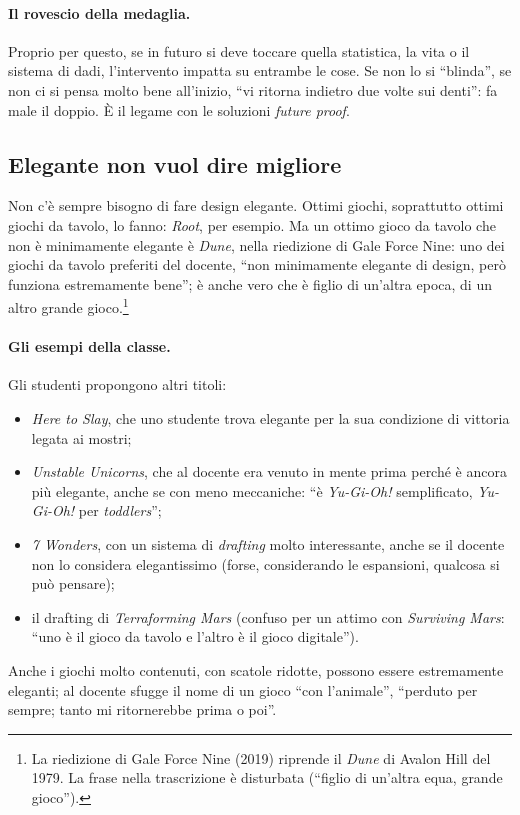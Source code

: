 \paragraph{Il rovescio della medaglia.} Proprio per questo, se in futuro si
deve toccare quella statistica, la vita o il sistema di dadi, l'intervento
impatta su entrambe le cose. Se non lo si ``blinda'', se non ci si pensa
molto bene all'inizio, ``vi ritorna indietro due volte sui denti'': fa male il
doppio. È il legame con le soluzioni \emph{future proof}.

\subsection{Elegante non vuol dire migliore}

Non c'è sempre bisogno di fare design elegante. Ottimi giochi, soprattutto
ottimi giochi da tavolo, lo fanno: \emph{Root}, per esempio. Ma un ottimo gioco
da tavolo che non è minimamente elegante è \emph{Dune}, nella riedizione di
Gale Force Nine: uno dei giochi da tavolo preferiti del docente, ``non
minimamente elegante di design, però funziona estremamente bene''; è anche
vero che è figlio di un'altra epoca, di un altro grande gioco.\footnote{La
riedizione di Gale Force Nine (2019) riprende il \emph{Dune} di Avalon Hill
del 1979. La frase nella trascrizione è disturbata (``figlio di un'altra equa,
grande gioco'').}

\paragraph{Gli esempi della classe.} Gli studenti propongono altri titoli:
\begin{itemize}
  \item \emph{Here to Slay}, che uno studente trova elegante per la sua
        condizione di vittoria legata ai mostri;
  \item \emph{Unstable Unicorns}, che al docente era venuto in mente prima
        perché è ancora più elegante, anche se con meno meccaniche: ``è
        \emph{Yu-Gi-Oh!} semplificato, \emph{Yu-Gi-Oh!} per \emph{toddlers}'';
  \item \emph{7 Wonders}, con un sistema di \emph{drafting} molto interessante,
        anche se il docente non lo considera elegantissimo (forse,
        considerando le espansioni, qualcosa si può pensare);
  \item il drafting di \emph{Terraforming Mars} (confuso per un attimo con
        \emph{Surviving Mars}: ``uno è il gioco da tavolo e l'altro è il gioco
        digitale'').
\end{itemize}
Anche i giochi molto contenuti, con scatole ridotte, possono essere
estremamente eleganti; al docente sfugge il nome di un gioco ``con
l'animale'', ``perduto per sempre; tanto mi ritornerebbe prima o poi''.


